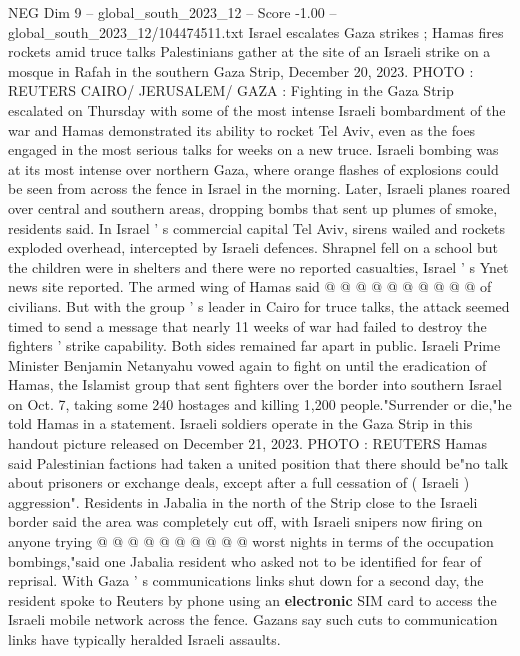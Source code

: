 \begin{textsample}{NEG Dim 9 – global\_south\_2023\_12 – Score -1.00 – global\_south\_2023\_12/104474511.txt}  \label{ex:f9_neg_445}
Israel escalates Gaza strikes ; Hamas fires rockets amid truce talks Palestinians gather at the site of an Israeli strike on a mosque in Rafah in the southern Gaza Strip, December 20, 2023.
PHOTO : REUTERS CAIRO/ JERUSALEM/ GAZA : Fighting in the Gaza Strip escalated on Thursday with some of the most intense Israeli bombardment of the war and Hamas demonstrated its ability to rocket Tel Aviv, even as the foes engaged in the most serious talks for weeks on a new truce.
Israeli bombing was at its most intense over northern Gaza, where orange flashes of explosions could be seen from across the fence in Israel in the morning.
Later, Israeli planes roared over central and southern areas, dropping bombs that sent up plumes of smoke, residents said.
In Israel ' s commercial capital Tel Aviv, sirens wailed and rockets exploded overhead, intercepted by Israeli defences.
Shrapnel fell on a school but the children were in shelters and there were no reported casualties, Israel ' s Ynet news site reported.
The armed wing of Hamas said @ @ @ @ @ @ @ @ @ @ of civilians.
But with the group ' s leader in Cairo for truce talks, the attack seemed timed to send a message that nearly 11 weeks of war had failed to destroy the fighters ' strike capability.
Both sides remained far apart in public.
Israeli Prime Minister Benjamin Netanyahu vowed again to fight on until the eradication of Hamas, the Islamist group that sent fighters over the border into southern Israel on Oct. 7, taking some 240 hostages and killing 1,200 people."Surrender or die,"he told Hamas in a statement.
Israeli soldiers operate in the Gaza Strip in this handout picture released on December 21, 2023.
PHOTO : REUTERS Hamas said Palestinian factions had taken a united position that there should be"no talk about prisoners or exchange deals, except after a full cessation of ( Israeli ) aggression".
Residents in Jabalia in the north of the Strip close to the Israeli border said the area was completely cut off, with Israeli snipers now firing on anyone trying @ @ @ @ @ @ @ @ @ @ worst nights in terms of the occupation bombings,"said one Jabalia resident who asked not to be identified for fear of reprisal.
With Gaza ' s communications links shut down for a second day, the resident spoke to Reuters by phone using an \textbf{electronic} SIM card to access the Israeli mobile network across the fence.
Gazans say such cuts to communication links have typically heralded Israeli assaults.

\end{textsample}
